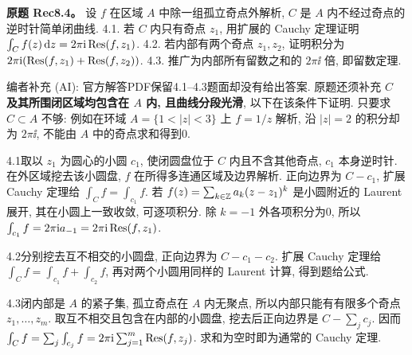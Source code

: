 \begin{exercise}
\textbf{原题 Rec8.4。}\label{ass:rec8-4}
设 $f$ 在区域 $A$ 中除一组孤立奇点外解析, $C$ 是 $A$ 内不经过奇点的逆时针简单闭曲线. 4.1. 若 $C$ 内只有奇点 $z_1$, 用扩展的 Cauchy 定理证明 $\int_Cf(z)\,\mathrm d z=2\pi\mathrm i\operatorname{Res}(f,z_1)$. 4.2. 若内部有两个奇点 $z_1,z_2$, 证明积分为 $2\pi\mathrm i(\operatorname{Res}(f,z_1)+\operatorname{Res}(f,z_2))$. 4.3. 推广为内部所有留数之和的 $2\pi\ii$ 倍, 即留数定理.
\end{exercise}
\begin{solution}
编者补充 (AI): 官方解答PDF保留4.1--4.3题面却没有给出答案. 原题还须补充 \textbf{$C$ 及其所围闭区域均包含在 $A$ 内, 且曲线分段光滑}, 以下在该条件下证明. 只要求 $C\subset A$ 不够: 例如在环域 $A=\{1<|z|<3\}$ 上 $f=1/z$ 解析, 沿 $|z|=2$ 的积分却为 $2\pi\ii$, 不能由 $A$ 中的奇点求和得到0.

4.1取以 $z_1$ 为圆心的小圆 $c_1$, 使闭圆盘位于 $C$ 内且不含其他奇点, $c_1$ 本身逆时针. 在外区域挖去该小圆盘, $f$ 在所得多连通区域及边界解析. 正向边界为 $C-c_1$, 扩展 Cauchy 定理给 $\int_C f=\int_{c_1}f$. 若 $f(z)=\sum_{k\in\mathbb Z}a_k(z-z_1)^k$ 是小圆附近的 Laurent 展开, 其在小圆上一致收敛, 可逐项积分. 除 $k=-1$ 外各项积分为0, 所以 $\int_{c_1}f=2\pi\mathrm i a_{-1}=2\pi\mathrm i\operatorname{Res}(f,z_1)$.

4.2分别挖去互不相交的小圆盘, 正向边界为 $C-c_1-c_2$. 扩展 Cauchy 定理给 $\int_Cf=\int_{c_1}f+\int_{c_2}f$, 再对两个小圆用同样的 Laurent 计算, 得到题给公式.

4.3闭内部是 $A$ 的紧子集, 孤立奇点在 $A$ 内无聚点, 所以内部只能有有限多个奇点 $z_1,\ldots,z_m$. 取互不相交且包含在内部的小圆盘, 挖去后正向边界是 $C-\sum_jc_j$. 因而 $\int_Cf=\sum_j\int_{c_j}f=2\pi\mathrm i\sum_{j=1}^m\operatorname{Res}(f,z_j)$. 求和为空时即为通常的 Cauchy 定理.
\end{solution}
